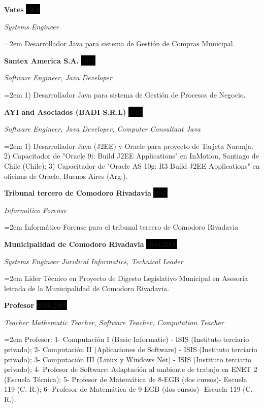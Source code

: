 \documentclass[paper=a4,fontsize=11pt]{scrartcl} %
\newcommand{\sepspace}{\vspace*{1em}}		%
\newcommand{\EducationEntry}[4]{
		\noindent \textbf{#1} \hfill      %
		\colorbox{Black}{%
			\parbox{6em}{%
			\hfill\color{White}#2}} \par  %
		\noindent \textit{#3} \par        %
		\noindent\hangindent=2em\hangafter=0 \small #4 %
		\normalsize \par}
\newcommand{\WorkEntry}[4]{				  %
		\noindent \textbf{#1} \hfill      %
		\colorbox{Black}{\color{White}#2} \par  %
		\noindent \textit{#3} \par              %
		\noindent\hangindent=2em\hangafter=0 \small #4 %
		\normalsize \par}
\begin{document}
\sepspace

\WorkEntry{Vates}{2008}{Systems Engineer}
{Desarrollador Java para sistema de Gestión de Compras Municipal.}

\sepspace

\WorkEntry{Santex America S.A.}{2007}{Software Engineer, Java Developer}
{1) Desarrollador Java para sistema de Gestión de Procesos de Negocio.}

\sepspace

\WorkEntry{AYI and Asociados (BADI S.R.L)}{2007}{Software Engineer, Java Developer, Computer Consultant Java}
{1) Desarrollador Java (J2EE) y Oracle para proyecto de Tarjeta Naranja.
2) Capacitador de "Oracle 9i: Build J2EE Applications" en InMotion, Santiago de Chile (Chile);
3) Capacitador de "Oracle AS 10g: R3 Build J2EE Applications" en oficinas de Oracle, Buenos Aires (Arg.).
}

\sepspace

\WorkEntry{Tribunal tercero de Comodoro Rivadavia}{2006}{Informático Forense}{
Informático Forense para el tribunal tercero de Comodoro Rivadavia}

\sepspace

\WorkEntry{Municipalidad de Comodoro Rivadavia}{2004-2006}{Systems Engineer Juridical Informatics, Technical Leader}
{Líder Técnico en Proyecto de Digesto Legislativo Municipal en Asesoría letrada de la Municipalidad de Comodoro Rivadavia.}

\sepspace

\WorkEntry{Profesor}{2004-2005}{Teacher Mathematic Teacher, Software Teacher, Computation Teacher}
{Profesor: 
1- Computación I (Basic Informatic) - ISIS (Instituto terciario privado); 
2- Computación II (Aplicaciones de Software) - ISIS (Instituto terciario privado); 
3- Computación III (Linux y Windows Net) - ISIS (Instituto terciario privado); 
4- Profesor de Software: Adaptación al ambiente de trabajo en ENET 2 (Escuela Técnica); 
5- Profesor de Matemática de 8-EGB  (dos cursos)- Escuela 119 (C. R.); 
6- Profesor de Matemática de 9-EGB (dos cursos)- Escuela 119 (C. R.).
}
\end{document}
